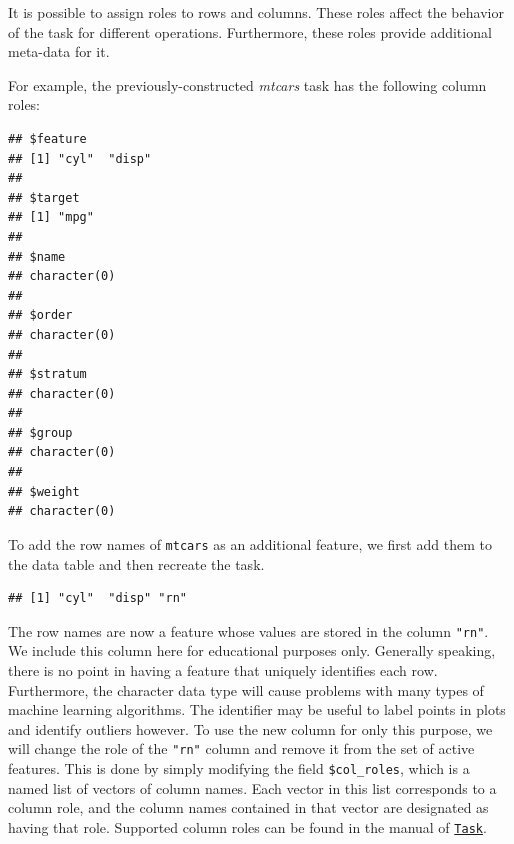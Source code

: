 \documentclass[]{article}
\newenvironment{Shaded}{\begin{snugshade}}{\end{snugshade}}
\newcommand{\CommentTok}[1]{\textcolor[rgb]{0.56,0.35,0.01}{\textit{#1}}}
\newcommand{\DataTypeTok}[1]{\textcolor[rgb]{0.13,0.29,0.53}{#1}}
\newcommand{\DecValTok}[1]{\textcolor[rgb]{0.00,0.00,0.81}{#1}}
\newcommand{\KeywordTok}[1]{\textcolor[rgb]{0.13,0.29,0.53}{\textbf{#1}}}
\newcommand{\NormalTok}[1]{#1}
\newcommand{\OperatorTok}[1]{\textcolor[rgb]{0.81,0.36,0.00}{\textbf{#1}}}
\newcommand{\OtherTok}[1]{\textcolor[rgb]{0.56,0.35,0.01}{#1}}
\newcommand{\StringTok}[1]{\textcolor[rgb]{0.31,0.60,0.02}{#1}}
\renewenvironment{Shaded} {\begin{snugshade}\small} {\end{snugshade}}
\begin{document}
It is possible to assign roles to rows and columns.
These roles affect the behavior of the task for different operations.
Furthermore, these roles provide additional meta-data for it.

For example, the previously-constructed \emph{mtcars} task has the following column roles:

\begin{Shaded}
\end{Shaded}

\begin{verbatim}
## $feature
## [1] "cyl"  "disp"
## 
## $target
## [1] "mpg"
## 
## $name
## character(0)
## 
## $order
## character(0)
## 
## $stratum
## character(0)
## 
## $group
## character(0)
## 
## $weight
## character(0)
\end{verbatim}

To add the row names of \texttt{mtcars} as an additional feature, we first add them to the data table and then recreate the task.

\begin{Shaded}
\end{Shaded}

\begin{verbatim}
## [1] "cyl"  "disp" "rn"
\end{verbatim}

The row names are now a feature whose values are stored in the column \texttt{"rn"}.
We include this column here for educational purposes only.
Generally speaking, there is no point in having a feature that uniquely identifies each row.
Furthermore, the character data type will cause problems with many types of machine learning algorithms.
The identifier may be useful to label points in plots and identify outliers however.
To use the new column for only this purpose, we will change the role of the \texttt{"rn"} column and remove it from the set of active features.
This is done by simply modifying the field \texttt{\$col\_roles}, which is a named list of vectors of column names.
Each vector in this list corresponds to a column role, and the column names contained in that vector are designated as having that role.
Supported column roles can be found in the manual of \href{https://mlr3.mlr-org.com/reference/Task.html}{\texttt{Task}}.
\end{document}
